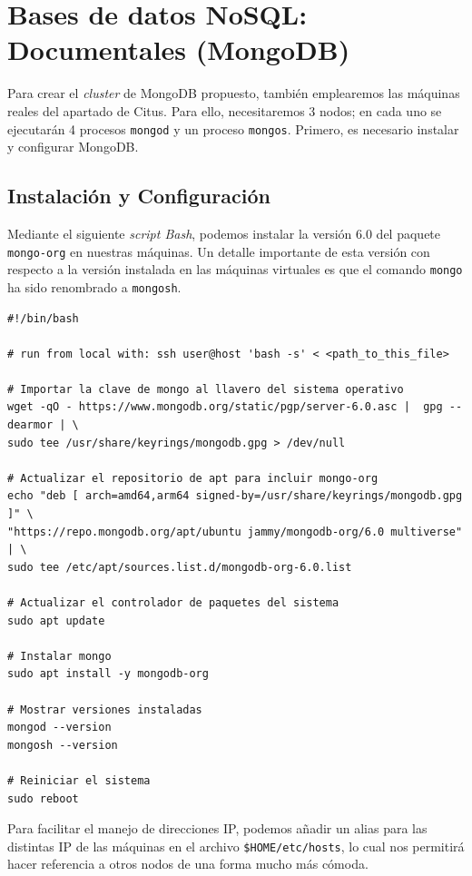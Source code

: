 \section{Bases de datos NoSQL: Documentales (MongoDB)}

Para crear el \textit{cluster} de MongoDB propuesto, también emplearemos las máquinas reales del apartado de Citus. Para ello, necesitaremos 3 nodos; en cada uno se ejecutarán 4 procesos \texttt{mongod} y un proceso \texttt{mongos}. Primero, es necesario instalar y configurar MongoDB.

\subsection*{Instalación y Configuración}

Mediante el siguiente \textit{script Bash}, podemos instalar la versión 6.0 del paquete \texttt{mongo-org} en nuestras máquinas. Un detalle importante de esta versión con respecto a la versión instalada en las máquinas virtuales es que el comando \texttt{mongo} ha sido renombrado a \texttt{mongosh}.

\begin{verbatim}
#!/bin/bash

# run from local with: ssh user@host 'bash -s' < <path_to_this_file>

# Importar la clave de mongo al llavero del sistema operativo
wget -qO - https://www.mongodb.org/static/pgp/server-6.0.asc |  gpg --dearmor | \
sudo tee /usr/share/keyrings/mongodb.gpg > /dev/null

# Actualizar el repositorio de apt para incluir mongo-org
echo "deb [ arch=amd64,arm64 signed-by=/usr/share/keyrings/mongodb.gpg ]" \
"https://repo.mongodb.org/apt/ubuntu jammy/mongodb-org/6.0 multiverse" | \
sudo tee /etc/apt/sources.list.d/mongodb-org-6.0.list

# Actualizar el controlador de paquetes del sistema
sudo apt update

# Instalar mongo
sudo apt install -y mongodb-org

# Mostrar versiones instaladas
mongod --version
mongosh --version

# Reiniciar el sistema
sudo reboot
\end{verbatim}

Para facilitar el manejo de direcciones IP, podemos añadir un alias para las distintas IP de las máquinas en el archivo \texttt{\$HOME/etc/hosts}, lo cual nos permitirá hacer referencia a otros nodos de una forma mucho más cómoda.

